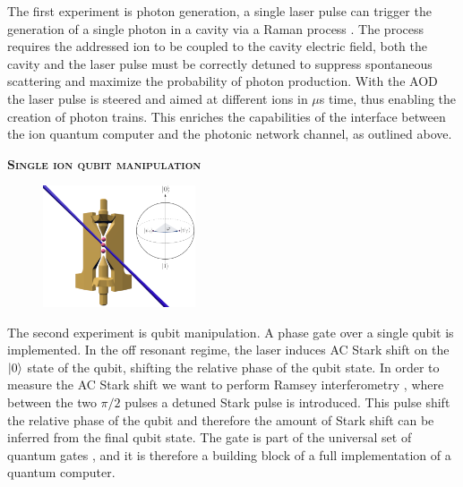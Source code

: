 \documentclass[english, a4paper, 12pt, twoside]{book}
\numberwithin{equation}{section} %
\begin{document}
The first experiment is photon generation, a single laser pulse can trigger the generation of a single photon in a cavity via a Raman process \cite{stuteinterface}. The process requires the addressed ion to be coupled to the cavity electric field,
both the cavity and the laser pulse must be correctly detuned to suppress spontaneous scattering and maximize the probability of photon production. With the AOD the laser pulse is steered and aimed at different ions in $\mu$s time, thus enabling the creation of photon trains. This enriches the capabilities of the interface between the ion quantum computer and the photonic network channel, as outlined above.\vspace{-1em}\newline
\begin{center}{\large\textbf{\textsc{Single ion qubit manipulation}}}\end{center}
\begin{figure}
  \begin{center}
    \includegraphics[width=0.4\textwidth]{qubitmanipulation2}
  \end{center}
\end{figure}
The second experiment is qubit manipulation. A phase gate \cite{chuang} over a single qubit is implemented. In the off resonant regime, the laser induces AC Stark shift on the $\ket{0}$ state of the qubit, shifting the relative phase of the qubit state. In order to measure the AC Stark shift we want to perform Ramsey interferometry \cite{starkshift}, where between the two $\pi/2$ pulses a detuned Stark pulse is introduced. This pulse shift the relative phase of the qubit and therefore the amount of Stark shift can be inferred from the final qubit state. The gate is part of the universal set of quantum gates \cite{chuang}, and it is therefore a building block of a full implementation of a quantum computer.
\end{document}
